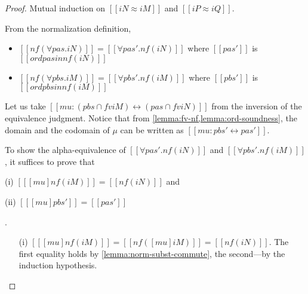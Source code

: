 \lemmaNormalizationCompleteness*
\begin{proof}
  Mutual induction on $[[iN ≈ iM]]$ and $[[iP ≈ iQ]]$.
  \begin{caseof}
  \item {\nameref{\ottdruleEOneForallLabel}} \label{case:ord-completeness:forall}
   From the normalization definition,
    \begin{itemize}
      \item $[[nf(∀pas.iN)]] = [[∀pas'.nf(iN)]]$ where $[[pas']]$ is $[[ord {pas} in nf(iN)]]$
      \item $[[nf(∀pbs.iM)]] = [[∀pbs'.nf(iM)]]$ where $[[pbs']]$ is $[[ord {pbs} in nf(iM)]]$
    \end{itemize}
    Let us take $[[mu : ({pbs} ∩ fv iM) ↔ ({pas} ∩ fv iN)]]$ from the
    inversion of the equivalence judgment. Notice that from
    \cref{lemma:fv-nf,lemma:ord-soundness}, the domain and the codomain of $\mu$ can be written
    as $[[mu : {pbs'} ↔ {pas'}]]$.
    
    To show the alpha-equivalence of $[[∀pas'.nf(iN)]]$ and $[[∀pbs'.nf(iM)]]$,
    it suffices to prove that
    \begin{enumerate*}
    \item[(i)] $[[ [mu] nf(iM) ]] = [[nf(iN)]]$ and \newline
    \item[(ii)] $[[ [mu]pbs' ]] = [[pas']]$
    \end{enumerate*}.
    
    \begin{enumerate}
    \item[(i)] $[[ [mu] nf(iM) ]] = [[nf([mu]iM)]] = [[nf(iN)]]$.
      The first equality holds by \cref{lemma:norm-subst-commute}, the second---by the induction hypothesis.


\end{enumerate}
\end{caseof}
\end{proof}
